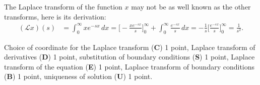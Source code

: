 \begin{diskussion}
The Laplace transform of the function $x$ may not be as well known
as the other transforms, here is its derivation:
\begin{align*}
(\mathscr{L}x)(s)
&=
\int_0^{\infty} xe^{-sx}\,dx
=
\biggl[
-\frac{xe^{-sx}}{s}
\biggr]_0^\infty
+
\int_0^\infty
\frac{e^{-sx}}{s}
\,dx
=
-\frac{1}{s}
\biggl[
\frac{e^{-sx}}s
\biggr]_0^\infty
=
\frac{1}{s^2}.
\end{align*}
\end{diskussion}

\begin{bewertung}
Choice of coordinate for the Laplace transform ({\bf C}) 1 point,
Laplace transform of derivatives ({\bf D}) 1 point,
substitution of boundary conditions ({\bf S}) 1 point,
Laplace transform of the equation ({\bf E}) 1 point,
Laplace transform of boundary conditions ({\bf B}) 1 point,
uniqueness of solution ({\bf U}) 1 point.
\end{bewertung}

